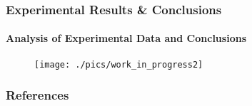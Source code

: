 \documentclass[xcolor={usenames,dvipsnames},hyperref={hyperindex,bookmarks}]{beamer}
\begin{document}
\begin{frame}
	\frametitle{Experimental Results \& Conclusions}
	\framesubtitle{Analysis of Experimental Data and Conclusions}
	
	\begin{figure}
		\centering
		\texttt{[image: ./pics/work\_in\_progress2]}
	\end{figure}
\end{frame}




{\linespread{1}
\begin{frame}
	\frametitle{References}
	
	
\end{frame}
}
\end{document}

